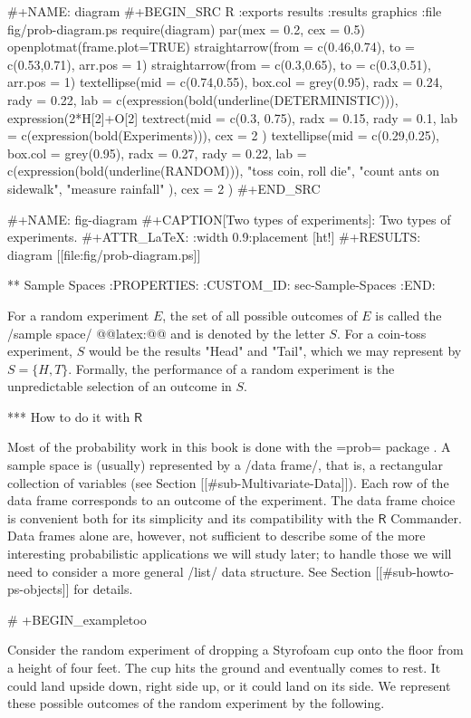 #+NAME: diagram
#+BEGIN_SRC R :exports results :results graphics :file fig/prob-diagram.ps
require(diagram)
par(mex = 0.2, cex = 0.5)
openplotmat(frame.plot=TRUE)
straightarrow(from = c(0.46,0.74), to = c(0.53,0.71), arr.pos = 1)
straightarrow(from = c(0.3,0.65), to = c(0.3,0.51), arr.pos = 1)
textellipse(mid = c(0.74,0.55), box.col = grey(0.95), 
  radx = 0.24, rady = 0.22, 
  lab = c(expression(bold(underline(DETERMINISTIC))), 
          expression(2*H[2]+O[2] %
textrect(mid = c(0.3, 0.75), radx = 0.15, rady = 0.1, 
  lab = c(expression(bold(Experiments))), cex = 2 )
textellipse(mid = c(0.29,0.25), box.col = grey(0.95), 
  radx = 0.27, rady = 0.22, lab = c(expression(bold(underline(RANDOM))), 
  "toss coin, roll die", "count ants on sidewalk", "measure rainfall" ), 
  cex = 2 )
#+END_SRC

#+NAME: fig-diagram
#+CAPTION[Two types of experiments]: \small Two types of experiments.
#+ATTR_LaTeX: :width 0.9\textwidth :placement [ht!]
#+RESULTS: diagram
[[file:fig/prob-diagram.ps]]

** Sample Spaces
:PROPERTIES:
:CUSTOM_ID: sec-Sample-Spaces
:END:

For a random experiment \(E\), the set of all possible outcomes of
\(E\) is called the /sample space/ @@latex:@@ and is denoted
by the letter \(S\). For a coin-toss experiment, \(S\) would be the
results "Head" and "Tail", which we may represent by \( S = \{H,T
\} \). Formally, the performance of a random experiment is the
unpredictable selection of an outcome in \(S\).

*** How to do it with \(\mathsf{R}\)

Most of the probability work in this book is done with the =prob=
package \cite{prob}. A sample space is (usually) represented by a
/data frame/, that is, a rectangular collection of variables (see
Section [[#sub-Multivariate-Data]]). Each row of the data frame corresponds to
an outcome of the experiment. The data frame choice is convenient both
for its simplicity and its compatibility with the \(\mathsf{R}\)
Commander. Data frames alone are, however, not sufficient to describe
some of the more interesting probabilistic applications we will study
later; to handle those we will need to consider a more general /list/
data structure. See Section [[#sub-howto-ps-objects]] for details.

# +BEGIN_exampletoo

Consider the random experiment of dropping a Styrofoam cup onto the
floor from a height of four feet. The cup hits the ground and
eventually comes to rest. It could land upside down, right side up, or
it could land on its side. We represent these possible outcomes of the
random experiment by the following.


